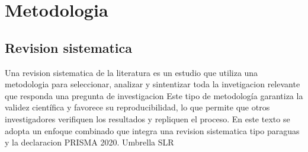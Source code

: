 \chapter{Metodologia}
\section{Revision sistematica}
Una revision sistematica de la literatura es un estudio 
que utiliza una metodologia para seleccionar, analizar y 
sintentizar toda la invetigacion relevante que responda una pregunta de investigacion 
Este tipo de metodología garantiza la validez científica y favorece su reproducibilidad, lo que permite que otros investigadores verifiquen los resultados 
y repliquen el proceso. En este texto se adopta un enfoque combinado que integra una revision sistematica
tipo paraguas y la declaracion PRISMA 2020.
Umbrella SLR   